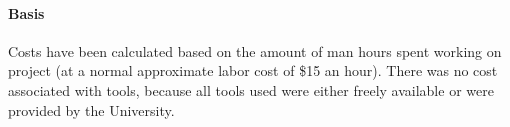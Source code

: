 \documentclass{article}
\begin{document}
\clearpage

\paragraph{Basis} Costs have been calculated based on the amount of man hours spent working on project (at a normal approximate labor cost of \$15 an hour). There was no cost associated with tools, because all tools used were either freely available or were provided by the University.

\clearpage

\listoffigures
\clearpage
\end{document}
